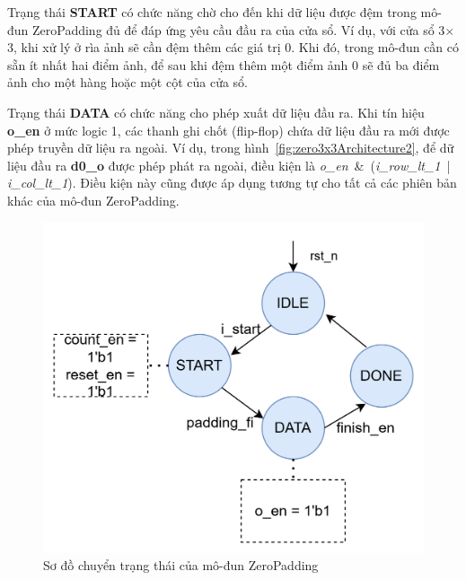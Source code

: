 Trạng thái \textbf{START} có chức năng chờ cho đến khi dữ liệu được đệm trong mô-đun ZeroPadding đủ để đáp ứng yêu cầu đầu ra của cửa sổ. Ví dụ, với cửa sổ 3$\times$3, khi xử lý ở rìa ảnh sẽ cần đệm thêm các giá trị 0. Khi đó, trong mô-đun cần có sẵn ít nhất hai điểm ảnh, để sau khi đệm thêm một điểm ảnh 0 sẽ đủ ba điểm ảnh cho một hàng hoặc một cột của cửa sổ.

Trạng thái \textbf{DATA} có chức năng cho phép xuất dữ liệu đầu ra. Khi tín hiệu \textbf{o\_en} ở mức logic 1, các thanh ghi chốt (flip-flop) chứa dữ liệu đầu ra mới được phép truyền dữ liệu ra ngoài. Ví dụ, trong hình~\ref{fig:zero3x3Architecture2}, để dữ liệu đầu ra \textbf{d0\_o} được phép phát ra ngoài, điều kiện là \textit{o\_en} \,\&\, (\textit{i\_row\_lt\_1} \,|\, \textit{i\_col\_lt\_1}). Điều kiện này cũng được áp dụng tương tự cho tất cả các phiên bản khác của mô-đun ZeroPadding.

\begin{figure}[!ht]
    \centering
    \includegraphics[width=0.6\linewidth]{figures/zeroPaddingTrans.png}
    \caption{Sơ đồ chuyển trạng thái của mô-đun ZeroPadding}
    \label{fig:zeroPaddingTrans}
\end{figure}


